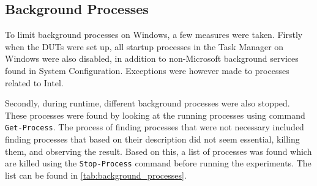 \subsection{Background Processes}

To limit background processes on Windows, a few measures were taken.  Firstly when the DUTs were set up, all startup processes in the Task Manager on Windows were also disabled, in addition to non-Microsoft background services found in System Configuration. Exceptions were however made to processes related to Intel.



Secondly, during runtime, different background processes were also stopped. These processes were found by looking at the running processes using command \texttt{Get-Process}. The process of finding processes that were not necessary included finding processes that based on their description did not seem essential, killing them, and observing the result. Based on this, a list of processes was found which are killed using the \texttt{Stop-Process} command before running the experiments. The list can be found in \cref{tab:background_processes}.